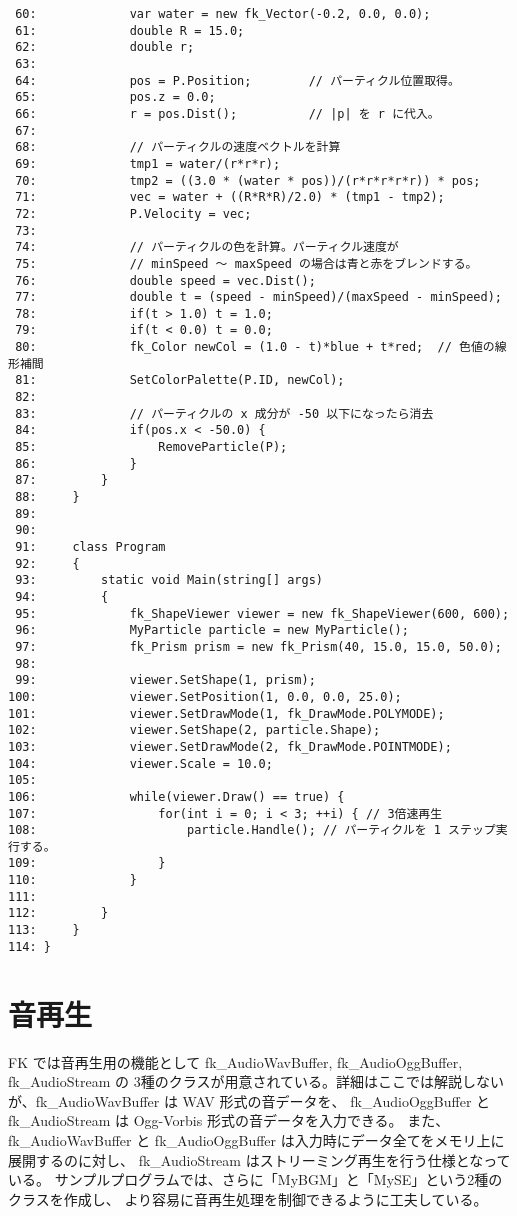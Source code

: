 \begin{breakbox}
\begin{small}
\begin{verbatim}
 60:             var water = new fk_Vector(-0.2, 0.0, 0.0);
 61:             double R = 15.0;
 62:             double r;
 63: 
 64:             pos = P.Position;        // パーティクル位置取得。
 65:             pos.z = 0.0;
 66:             r = pos.Dist();          // |p| を r に代入。
 67: 
 68:             // パーティクルの速度ベクトルを計算
 69:             tmp1 = water/(r*r*r);
 70:             tmp2 = ((3.0 * (water * pos))/(r*r*r*r*r)) * pos;
 71:             vec = water + ((R*R*R)/2.0) * (tmp1 - tmp2);
 72:             P.Velocity = vec;
 73: 
 74:             // パーティクルの色を計算。パーティクル速度が
 75:             // minSpeed ～ maxSpeed の場合は青と赤をブレンドする。
 76:             double speed = vec.Dist();
 77:             double t = (speed - minSpeed)/(maxSpeed - minSpeed);
 78:             if(t > 1.0) t = 1.0;
 79:             if(t < 0.0) t = 0.0;
 80:             fk_Color newCol = (1.0 - t)*blue + t*red;  // 色値の線形補間
 81:             SetColorPalette(P.ID, newCol);
 82: 
 83:             // パーティクルの x 成分が -50 以下になったら消去
 84:             if(pos.x < -50.0) {
 85:                 RemoveParticle(P);
 86:             }
 87:         } 
 88:     }           
 89: 
 90: 
 91:     class Program
 92:     {
 93:         static void Main(string[] args)
 94:         {
 95:             fk_ShapeViewer viewer = new fk_ShapeViewer(600, 600);
 96:             MyParticle particle = new MyParticle();
 97:             fk_Prism prism = new fk_Prism(40, 15.0, 15.0, 50.0);
 98: 
 99:             viewer.SetShape(1, prism);
100:             viewer.SetPosition(1, 0.0, 0.0, 25.0);
101:             viewer.SetDrawMode(1, fk_DrawMode.POLYMODE);
102:             viewer.SetShape(2, particle.Shape);
103:             viewer.SetDrawMode(2, fk_DrawMode.POINTMODE);
104:             viewer.Scale = 10.0;
105:  
106:             while(viewer.Draw() == true) {
107:                 for(int i = 0; i < 3; ++i) { // 3倍速再生
108:                     particle.Handle(); // パーティクルを 1 ステップ実行する。
109:                 }
110:             }
111: 
112:         }
113:     }
114: }
\end{verbatim}
\end{small}
\end{breakbox}



\section{音再生}

FK では音再生用の機能として fk\_AudioWavBuffer, fk\_AudioOggBuffer, fk\_AudioStream の
3種のクラスが用意されている。詳細はここでは解説しないが、fk\_AudioWavBuffer は WAV 形式の音データを、
fk\_AudioOggBuffer と fk\_AudioStream は Ogg-Vorbis 形式の音データを入力できる。
また、fk\_AudioWavBuffer と fk\_AudioOggBuffer は入力時にデータ全てをメモリ上に展開するのに対し、
fk\_AudioStream はストリーミング再生を行う仕様となっている。
サンプルプログラムでは、さらに「MyBGM」と「MySE」という2種のクラスを作成し、
より容易に音再生処理を制御できるように工夫している。

